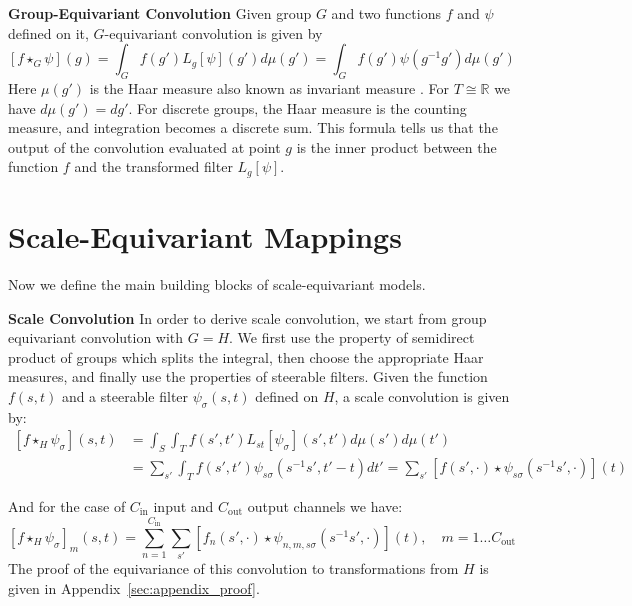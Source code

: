 \documentclass{article} \usepackage{multirow}
\def\Apref#1{Appendix~\ref{#1}}
\begin{document}
\textbf{Group-Equivariant Convolution}
Given group $G$ and two functions $f$ and $\psi$ defined on it, 
$G$-equivariant convolution is given by
\begin{equation}
    \label{eq:g_con_def}
    [f \star_G \psi](g) = \int_G f(g') L_{g}[\psi](g') d\mu(g') = \int_G f(g') \psi(g^{-1}g') d\mu(g')
\end{equation}
Here $\mu(g')$ is the Haar measure also known as invariant measure \citet{folland2016course}. For 
$T\cong\mathbb{R}$ we have $d\mu(g')=dg'$.
For discrete groups, the Haar measure is the counting measure, and integration becomes a discrete sum.
This formula tells us that the output of the convolution evaluated at point $g$ is 
the inner product between the function $f$ and the transformed filter $L_g[\psi]$.


 \section{Scale-Equivariant Mappings}
\label{sec:ses_conv}
Now we define the main building blocks 
of scale-equivariant models. 

\textbf{Scale Convolution}
In order to derive scale convolution, we start from group equivariant convolution with $G=H$. We first 
use the property of semidirect product of groups which splits the integral, then choose the appropriate 
Haar measures, and 
finally use the properties of steerable filters.
Given the function $f(s, t)$ and a steerable filter $\psi_\sigma(s, t)$ defined on $H$, 
a scale convolution is given by:
\begin{equation}
    \label{eq:scale_conv_def0}
    \begin{split}
        [f \star_H \psi_\sigma](s, t)
        &= \int_S \int_T f(s', t') L_{st}[\psi_\sigma](s', t') d\mu(s') d\mu(t') \\
        &= \sum_{s'} \int_T f(s', t') \psi_{s\sigma}(s^{-1}s', t'-t) dt' 
        = \sum_{s'}  [f(s', \cdot) \star \psi_{s\sigma}(s^{-1}s', \cdot)](t) 
    \end{split}
\end{equation}

And for the case of $C_\text{in}$ input and $C_\text{out}$ output channels we have:
\begin{equation}
    \label{eq:scale_conv_def}
    [f \star_H \psi_\sigma]_m(s, t)
    = \sum_{n=1}^{C_\text{in}}\sum_{s'}  [f_n(s', \cdot) \star \psi_{n,m,s\sigma}(s^{-1}s', \cdot)](t),
    \quad m=1\dots C_\text{out}
\end{equation}
The proof of the equivariance of this convolution to transformations from $H$ is given in \Apref{sec:appendix_proof}. 
\end{document}
